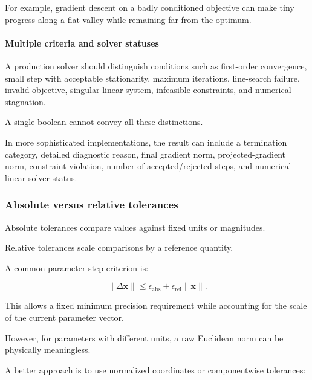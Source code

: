 For example, gradient descent on a badly conditioned objective can make tiny progress along a flat valley while remaining far from the optimum.

\paragraph{Multiple criteria and solver statuses}\label{02-foundations-ii-ch027-multiple-criteria-and-solver-statuses}

\hypertarget{02-foundations-ii-ch027-multiple-criteria-and-solver-statuses}{}

A production solver should distinguish conditions such as first-order convergence, small step with acceptable stationarity, maximum iterations, line-search failure, invalid objective, singular linear system, infeasible constraints, and numerical stagnation.

A single boolean  cannot convey all these distinctions.

In more sophisticated implementations, the result can include a termination category, detailed diagnostic reason, final gradient norm, projected-gradient norm, constraint violation, number of accepted/rejected steps, and numerical linear-solver status.

\subsubsection{Absolute versus relative tolerances}\label{02-foundations-ii-ch027-absolute-versus-relative-tolerances}

\hypertarget{02-foundations-ii-ch027-absolute-versus-relative-tolerances}{}

Absolute tolerances compare values against fixed units or magnitudes.

Relative tolerances scale comparisons by a reference quantity.

A common parameter-step criterion is:

\[
\boxed{ \|\Delta\mathbf x\| \le \epsilon_{\mathrm{abs}}+ \epsilon_{\mathrm{rel}}\|\mathbf x\| }.
\]

This allows a fixed minimum precision requirement while accounting for the scale of the current parameter vector.

However, for parameters with different units, a raw Euclidean norm can be physically meaningless.

A better approach is to use normalized coordinates or componentwise tolerances:

